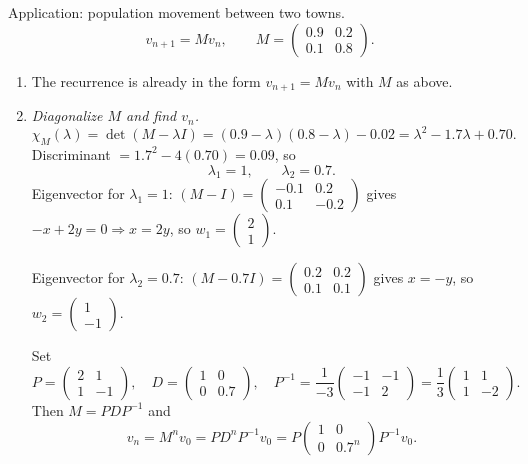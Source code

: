 \documentclass[11pt]{article}
\def\textbf#1{#1}%
\def\mathbf#1{#1}%
\begin{document}

\begin{solution}
\textbf{Application: population movement between two towns.}
\[
\mathbf{v}_{n+1}=M\mathbf{v}_n,\qquad
M=\begin{pmatrix}0.9&0.2\\[2pt]0.1&0.8\end{pmatrix}.
\]
\begin{enumerate}
\item The recurrence is already in the form $\mathbf{v}_{n+1}=M\mathbf{v}_n$ with $M$ as above.

\item \emph{Diagonalize $M$ and find $\mathbf{v}_n$.}
\[
\chi_M(\lambda)=\det(M-\lambda I)
=(0.9-\lambda)(0.8-\lambda)-0.02
=\lambda^2-1.7\lambda+0.70.
\]
Discriminant $=1.7^2-4(0.70)=0.09$, so
\[
\lambda_1=1,\qquad \lambda_2=0.7.
\]
Eigenvector for $\lambda_1=1$: $(M-I)=\begin{pmatrix}-0.1&0.2\\[2pt]0.1&-0.2\end{pmatrix}$ gives $-x+2y=0\Rightarrow x=2y$,
so $\mathbf{w}_1=\begin{pmatrix}2\\[2pt]1\end{pmatrix}$.

Eigenvector for $\lambda_2=0.7$: $(M-0.7I)=\begin{pmatrix}0.2&0.2\\[2pt]0.1&0.1\end{pmatrix}$ gives $x=-y$,
so $\mathbf{w}_2=\begin{pmatrix}1\\[2pt]-1\end{pmatrix}$.

Set
\[
P=\begin{pmatrix}2&1\\[2pt]1&-1\end{pmatrix},\quad
D=\begin{pmatrix}1&0\\[2pt]0&0.7\end{pmatrix},\quad
P^{-1}=\frac{1}{-3}\begin{pmatrix}-1&-1\\[2pt]-1&2\end{pmatrix}
=\frac13\begin{pmatrix}1&1\\[2pt]1&-2\end{pmatrix}.
\]
Then $M=PDP^{-1}$ and
\[
\mathbf{v}_n=M^n\mathbf{v}_0=P D^n P^{-1}\mathbf{v}_0
= P\begin{pmatrix}1&0\\[2pt]0&0.7^n\end{pmatrix}P^{-1}\mathbf{v}_0.
\]


\end{enumerate}
\end{solution}
\end{document}
